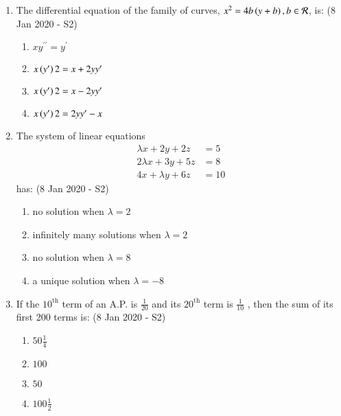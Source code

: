 \documentclass[journal]{IEEEtran}
\begin{document}
\begin{enumerate}
    \item The differential equation of the family of curves, $x^2 = 4b\left(y + b\right), b \in \mathcal{R}$, is: \hfill (8 Jan 2020 - S2)
    \begin{multicols}{2}
    \begin{enumerate}
        \item $xy^{\prime\prime} = y^\prime$
        \item $x\left(y^\prime\right) 2 = x + 2yy^\prime$
        \columnbreak
        \item $x\left(y ^\prime \right) 2 = x - 2yy^\prime$
        \item $x\left(y ^\prime \right) 2 = 2yy ^\prime - x$
    \end{enumerate}
    \end{multicols}

    
    \item The system of linear equations
    \begin{align*}
        \lambda x + 2y + 2z &= 5 \\
        2\lambda x + 3y + 5z &= 8 \\
        4x + \lambda y + 6z &= 10     
    \end{align*}
    has: \hfill (8 Jan 2020 - S2)
    
    \begin{multicols}{2}
        \begin{enumerate}
            \item no solution when $\lambda = 2$
            \item infinitely many solutions when $\lambda = 2$
            \columnbreak
            \item no solution when $\lambda = 8$
            \item a unique solution when $\lambda = -8$
        \end{enumerate}
    \end{multicols}
    
    \item If the $10^\text{th}$ term of an A.P. is $\frac{1}{20}$ and its $20^\text{th}$ term is $\frac{1}{10}$ , then the sum of its first 200 terms is: \hfill (8 Jan 2020 - S2)
    \begin{multicols}{2}
        \begin{enumerate}
            \item $50 \frac{1}{4}$
            \item $100$
            \columnbreak
            \item $50$
            \item $100 \frac{1}{2}$
        \end{enumerate}
    \end{multicols}
    

\end{enumerate}
\end{document}
